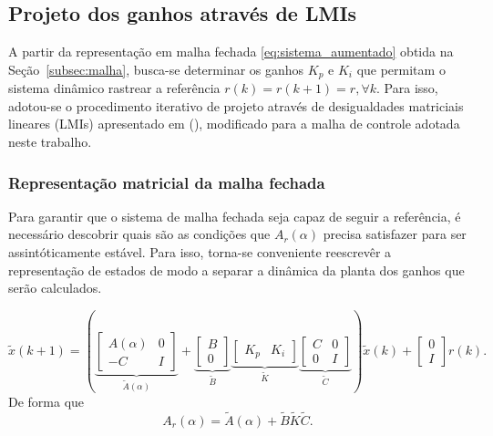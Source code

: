 \subsection{Projeto dos ganhos através de LMIs}
\label{subsec:lmis}

A partir da representação em malha fechada \eqref{eq:sistema_aumentado} obtida na Seção~\ref{subsec:malha}, busca-se determinar os ganhos $K_p$ e $K_i$ que permitam o sistema dinâmico rastrear a referência $r(k)=r(k+1)=r,\forall k$. Para isso, adotou-se o procedimento iterativo de projeto através de desigualdades matriciais lineares (LMIs) apresentado em (\cite{morais_reference}), modificado para a malha de controle adotada neste trabalho. 

\subsubsection{Representação matricial da malha fechada}

Para garantir que o sistema de malha fechada seja capaz de seguir a referência, é necessário descobrir quais são as condições que $A_r(\alpha)$ precisa satisfazer para ser assintóticamente estável. Para isso, torna-se conveniente reescrevêr a representação de estados de modo a separar a dinâmica da planta dos ganhos que serão calculados.

\begin{equation}
    \widetilde{x}(k+1)=
    \left(
        \underbrace{
            \begin{bmatrix}
                A(\alpha) & 0 \\
                -C & I
            \end{bmatrix}
        }_{\widetilde{A}(\alpha)}
        +
        \underbrace{
            \begin{bmatrix}
                B\\0
            \end{bmatrix}
        }_{\widetilde{B}}
        \underbrace{
            \begin{bmatrix}
                K_p & K_i
            \end{bmatrix}
        }_{\widetilde{K}}
        \underbrace{
            \begin{bmatrix}
                C & 0\\
                0 & I
            \end{bmatrix}
        }_{\widetilde{C}}
    \right)\widetilde{x}(k)
    +
    \begin{bmatrix}
    0\\
    I
    \end{bmatrix}r(k).
    \label{eq:sistema_aumentado_fatorado}
\end{equation}
De forma que
\begin{equation}
    A_r(\alpha)=\widetilde A(\alpha)+\widetilde B\widetilde K\widetilde C.
    \label{eq:lmi_realimentacao_matricial}
\end{equation}

